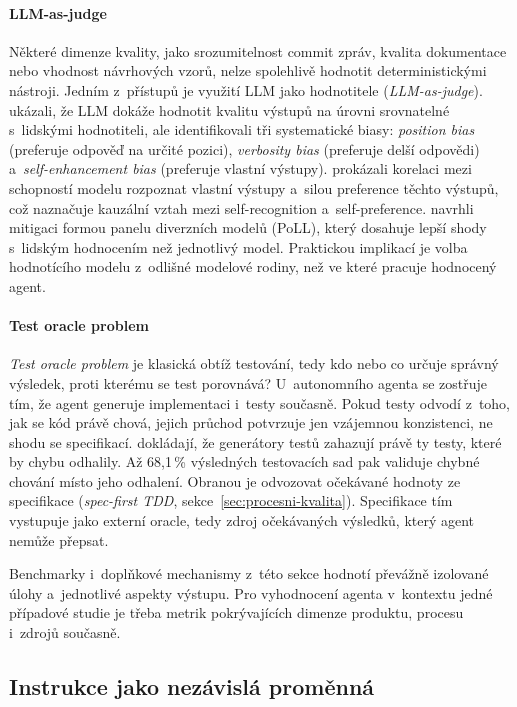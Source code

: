 \paragraph{LLM-as-judge}
Některé dimenze kvality, jako srozumitelnost commit zpráv, kvalita
dokumentace nebo vhodnost návrhových vzorů, nelze spolehlivě hodnotit
deterministickými nástroji. Jedním z~přístupů je využití LLM jako
hodnotitele (\textit{LLM-as-judge}). \textcite{zheng2023mtbench}
ukázali, že LLM dokáže hodnotit kvalitu výstupů na úrovni
srovnatelné s~lidskými hodnotiteli, ale identifikovali tři
systematické biasy: \textit{position bias} (preferuje odpověď
na určité pozici), \textit{verbosity bias} (preferuje delší
odpovědi) a~\textit{self-enhancement bias} (preferuje vlastní
výstupy). \textcite{panickssery2024} prokázali
korelaci mezi schopností modelu rozpoznat vlastní výstupy a~silou
preference těchto výstupů, což naznačuje kauzální vztah mezi
self-recognition a~self-preference. \textcite{verga2024poll}
navrhli mitigaci formou panelu diverzních modelů (PoLL), který
dosahuje lepší shody s~lidským hodnocením než jednotlivý model.
Praktickou implikací je volba hodnotícího modelu z~odlišné modelové
rodiny, než ve které pracuje hodnocený agent.

\paragraph{Test oracle problem}
\textit{Test oracle problem} je klasická obtíž testování, tedy kdo
nebo co určuje správný výsledek, proti kterému se test porovnává?
U~autonomního agenta se zostřuje tím, že agent generuje
implementaci i~testy současně. Pokud testy odvodí z~toho, jak
se kód právě chová, jejich průchod potvrzuje jen vzájemnou
konzistenci, ne shodu se specifikací. \textcite{mathews2024}
dokládají, že generátory testů zahazují právě ty testy, které
by chybu odhalily. Až 68,1\,\% výsledných testovacích sad pak
validuje chybné chování místo jeho odhalení. Obranou je odvozovat
očekávané hodnoty ze specifikace (\textit{spec-first TDD},
sekce~\ref{sec:procesni-kvalita}). Specifikace tím vystupuje jako
externí oracle, tedy zdroj očekávaných výsledků, který agent nemůže
přepsat.

Benchmarky i~doplňkové mechanismy z~této sekce hodnotí
převážně izolované úlohy a~jednotlivé aspekty výstupu. Pro
vyhodnocení agenta v~kontextu jedné případové studie je třeba metrik
pokrývajících dimenze produktu, procesu i~zdrojů současně.

\subsection{Instrukce jako nezávislá proměnná}
\label{sec:scaffolding}
\label{sec:problem-kontextu}
\label{sec:pristupy-memory}
\label{sec:scaffolding-instrukce}

